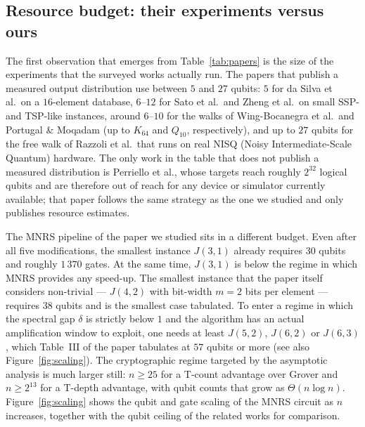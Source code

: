 \documentclass[11pt,a4paper]{article}
\begin{document}
\subsection{Resource budget: their experiments versus ours}

The first observation that emerges from Table~\ref{tab:papers}
is the size of the experiments that the surveyed works actually
run. The papers that publish a measured output distribution use
between $5$ and $27$ qubits: $5$ for da Silva et al.\ on a
$16$-element database, $6$--$12$ for Sato et al.\ and Zheng et
al.\ on small SSP- and TSP-like instances, around $6$--$10$ for
the walks of Wing-Bocanegra et al.\ and Portugal \& Moqadam (up to
$K_{64}$ and $Q_{10}$, respectively), and up to $27$
qubits for the free walk of Razzoli et al.\ that runs on real
NISQ (Noisy Intermediate-Scale Quantum) hardware. The only work in the table that does not publish
a measured distribution is Perriello et al., whose targets reach
roughly $2^{32}$ logical qubits and are therefore out of reach
for any device or simulator currently available; that paper
follows the same strategy as the one we studied and only
publishes resource estimates.

The MNRS pipeline of the paper we studied sits in a different
budget. Even after all five modifications, the smallest instance $J(3,1)$
already requires $30$ qubits and roughly $1\,370$ gates.
At the same time, $J(3,1)$ is below the regime in which MNRS provides any speed-up.
The smallest instance that the paper itself considers
non-trivial --- $J(4,2)$ with bit-width $m=2$ bits per element ---
requires $38$ qubits and is the smallest case tabulated. To enter a regime in which
the spectral gap $\delta$ is strictly below $1$ and the algorithm
has an actual amplification window to exploit, one needs at least
$J(5,2)$, $J(6,2)$ or $J(6,3)$, which Table~III of the paper tabulates
at $57$ qubits or more (see also Figure~\ref{fig:scaling}). The cryptographic regime targeted by
the asymptotic analysis is much larger still: $n \ge 25$ for a
T-count advantage over Grover and $n \ge 2^{13}$ for a T-depth
advantage, with qubit counts that grow as $\Theta(n \log n)$.
Figure~\ref{fig:scaling} shows the qubit and gate scaling of the MNRS
circuit as $n$ increases, together with the qubit ceiling of the related
works for comparison.
\end{document}
